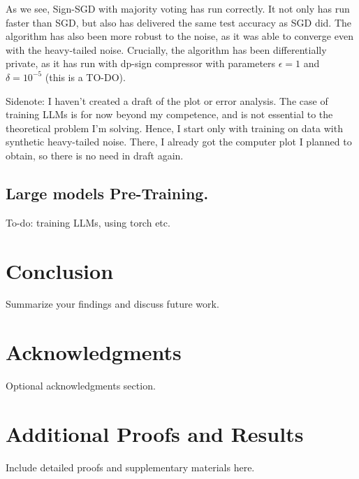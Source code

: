 \documentclass[12pt]{article}
\begin{document}
As we see, Sign-SGD with majority voting has run correctly. It not only has run faster than SGD, but also has delivered the same test accuracy as SGD did. The algorithm has also been more robust to the noise, as it was able to converge even with the heavy-tailed noise. Crucially, the algorithm has been differentially private, as it has run with dp-sign compressor with parameters $\epsilon = 1$ and $\delta = 10^{-5}$ (this is a TO-DO).

Sidenote: I haven't created a draft of the plot or error analysis. The case of training LLMs is for now beyond my competence, and is not essential to the theoretical problem I'm solving. Hence, I start only with training on data with synthetic heavy-tailed noise. There, I already got the computer plot I planned to obtain, so there is no need in draft again.

\subsection{Large models Pre-Training.}
To-do: training LLMs, using torch etc.

\section{Conclusion}
Summarize your findings and discuss future work.

\section{Acknowledgments}
Optional acknowledgments section.

\appendix
\section{Additional Proofs and Results}
Include detailed proofs and supplementary materials here.

\printbibliography
\end{document}

